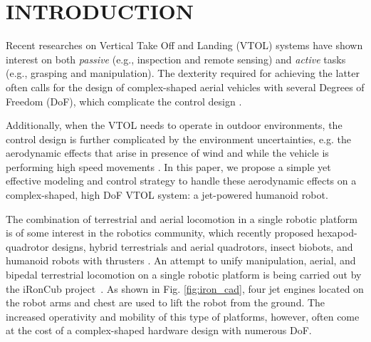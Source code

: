 \section{INTRODUCTION}
Recent researches on Vertical Take Off and Landing (VTOL) systems have shown interest on both \emph{passive} (e.g., inspection and remote sensing) and \emph{active} tasks (e.g., grasping and manipulation). The dexterity required for achieving the latter often calls for the design of complex-shaped aerial vehicles with several Degrees of Freedom (DoF), which complicate the control design \cite{c8}\cite{c9}\cite{c10}. 

Additionally, when the VTOL needs to operate in outdoor environments, the control design is further complicated by the environment uncertainties, e.g. the aerodynamic effects that arise in presence of wind and while the vehicle is performing high speed movements \cite{c11}\cite{c13}. In this paper, we propose a simple yet effective modeling and control strategy to handle these aerodynamic effects on a complex-shaped, high DoF VTOL system: a jet-powered humanoid robot.

%



The combination of terrestrial and aerial locomotion in a single robotic platform is of some interest in the robotics community, which recently proposed hexapod-quadrotor designs, hybrid terrestrials and aerial quadrotors, insect biobots, and humanoid robots with thrusters \cite{pitonyak2017hexapod}\cite{kalantari2013hytaq}\cite{bozkurt2009insectbio}\cite{LeoCaltech}\cite{Jet-HR1}. An attempt to unify manipulation, aerial, and bipedal terrestrial locomotion on a single robotic platform is being carried out by the iRonCub project~\cite{Bartolozzi2017iCubTN}\cite{c1}\cite{c2}. As shown in Fig. \ref{fig:iron_cad}, four jet engines located on the robot arms and chest are used to lift the robot from the ground. The increased operativity and mobility of this type of platforms, however, often come at the cost of a complex-shaped hardware design with numerous DoF.

